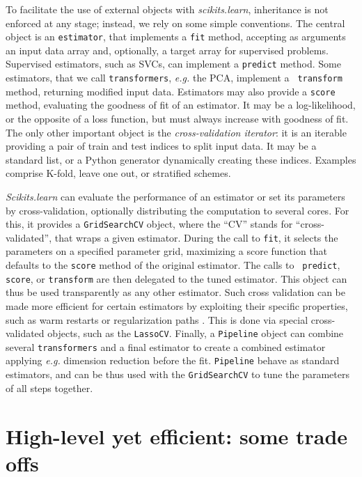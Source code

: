 \documentclass[twoside,11pt]{article}
\begin{document}
%
To facilitate the use of external objects with \emph{scikits.learn},
inheritance is not enforced at any stage; instead, we rely on some simple
conventions. The central object is an {\tt estimator}, that implements a
{\tt fit} method, accepting as arguments an input data array and,
optionally, a target array for supervised problems. Supervised estimators,
such as SVCs, can implement a {\tt predict} method. Some estimators,
that we call {\tt transformers}, \emph{e.g.} the PCA, implement a {\tt
transform} method, returning modified input data.
%
Estimators may also provide a {\tt score} method, evaluating the goodness
of fit of an estimator. It may be a log-likelihood, or the opposite of a
loss function, but must always increase with goodness of fit.
%
The only other important object is the \emph{cross-validation iterator}:
it is an iterable providing a pair of train and test indices to split input
data. It may be a standard list, or a Python generator dynamically
creating these indices. Examples comprise K-fold, leave one out, or
stratified schemes. 


\smallskip {}
%
\emph{Scikits.learn} can evaluate the performance of an estimator or set
its parameters by cross-validation, optionally distributing the
computation to several cores. For this, it provides a {\tt GridSearchCV}
object, where the ``CV'' stands for ``cross-validated'', that wraps a
given estimator. During the call to {\tt fit}, it selects the parameters
on a specified parameter grid, maximizing a score function that defaults
to the {\tt score} method of the original estimator. The calls to {\tt
predict}, {\tt score}, or {\tt transform} are then delegated to the tuned
estimator. This object can thus be used transparently as any other
estimator. Such cross validation can be made more efficient for certain
estimators by exploiting their specific properties, such as warm restarts
or regularization paths \citep{friedman2010} . This is done via special
cross-validated
objects, such as the {\tt LassoCV}. Finally, a {\tt Pipeline} object can
combine several {\tt transformers} and a final estimator to create a
combined estimator applying \emph{e.g.} dimension reduction before the
fit. {\tt Pipeline} behave as standard estimators, and can be thus used
with the {\tt GridSearchCV} to tune the parameters of all steps together.

\section{High-level yet efficient: some trade offs}
\end{document}
